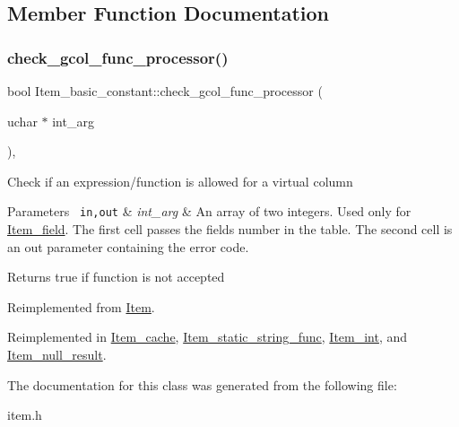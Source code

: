 \subsection{Member Function Documentation}
\mbox{\label{classItem__basic__constant_a6240f3253090d2fc91f87a7a1cb773a7}} 
\subsubsection{\texorpdfstring{check\+\_\+gcol\+\_\+func\+\_\+processor()}{check\_gcol\_func\_processor()}}
{\footnotesize\ttfamily bool Item\+\_\+basic\+\_\+constant\+::check\+\_\+gcol\+\_\+func\+\_\+processor (\begin{DoxyParamCaption}\item[{uchar $\ast$}]{int\+\_\+arg }\end{DoxyParamCaption})\hspace{0.3cm}{\ttfamily [inline]}, {\ttfamily [virtual]}}

Check if an expression/function is allowed for a virtual column


\begin{DoxyParams}[1]{Parameters}
\mbox{\texttt{ in,out}}  & {\em int\+\_\+arg} & An array of two integers. Used only for \mbox{\hyperlink{classItem__field}{Item\+\_\+field}}. The first cell passes the field\textquotesingle{}s number in the table. The second cell is an out parameter containing the error code.\\
\hline
\end{DoxyParams}
\begin{DoxyReturn}{Returns}
true if function is not accepted 
\end{DoxyReturn}


Reimplemented from \mbox{\hyperlink{classItem_af75e3659f732265cbe72824803f208f2}{Item}}.



Reimplemented in \mbox{\hyperlink{classItem__cache_ae62bc37e1839d9749fdd70c485506c5f}{Item\+\_\+cache}}, \mbox{\hyperlink{classItem__static__string__func_affbcad090aae0059272342f77d51ae90}{Item\+\_\+static\+\_\+string\+\_\+func}}, \mbox{\hyperlink{classItem__int_ae1ea6b10f3987835fc6d7ec45bb11f94}{Item\+\_\+int}}, and \mbox{\hyperlink{classItem__null__result_a2e623724f3729cea2a1b54c3d5f7dbd4}{Item\+\_\+null\+\_\+result}}.



The documentation for this class was generated from the following file\+:\begin{DoxyCompactItemize}
\item 
item.\+h\end{DoxyCompactItemize}

